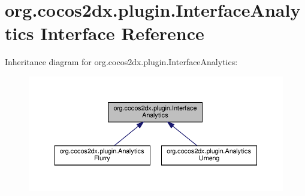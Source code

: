 \hypertarget{interfaceorg_1_1cocos2dx_1_1plugin_1_1InterfaceAnalytics}{}\section{org.\+cocos2dx.\+plugin.\+Interface\+Analytics Interface Reference}
\label{interfaceorg_1_1cocos2dx_1_1plugin_1_1InterfaceAnalytics}


Inheritance diagram for org.\+cocos2dx.\+plugin.\+Interface\+Analytics\+:
\nopagebreak
\begin{figure}[H]
\begin{center}
\leavevmode
\includegraphics[width=350pt]{interfaceorg_1_1cocos2dx_1_1plugin_1_1InterfaceAnalytics__inherit__graph}
\end{center}
\end{figure}
